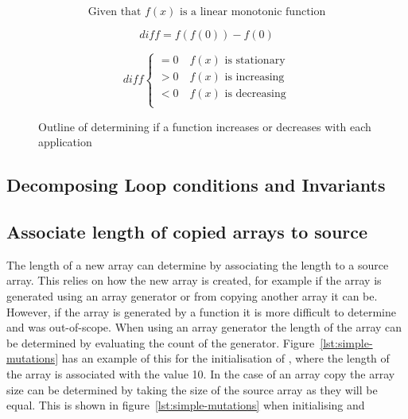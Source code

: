\begin{figure}
    $$\text{Given that } f(x) \text{ is a linear monotonic function}$$

    $$diff = f(f(0)) - f(0)$$

    \[
        diff \begin{cases}
            = 0 \quad f(x) \text{ is stationary}\\
            > 0 \quad f(x) \text{ is increasing}\\
            < 0 \quad f(x) \text{ is decreasing}\\
        \end{cases}
    \]
    \caption{Outline of determining if a function increases or decreases with
    each application}
\label{math:simple-mutation}
\end{figure}

\subsection{Decomposing Loop conditions and Invariants}\label{s:cond-decompose}

\subsection{Associate length of copied arrays to source}\label{s:copied-array}

The length of a new array can determine by associating the length to a source
array.
This relies on how the new array is created, for example if the array is
generated using an array generator or from copying another array it can be.
However, if the array is generated by a function it is more difficult to
determine and was out-of-scope.
When using an array generator the length of the array can be determined by
evaluating the count of the generator.
Figure~\ref{lst:simple-mutations} has an example of this for the initialisation
of , where the length of the array is associated with the value 10.
In the case of an array copy the array size can be determined by taking the
size of the source array as they will be equal.
This is shown in figure~\ref{lst:simple-mutations} when initialising 
and 

